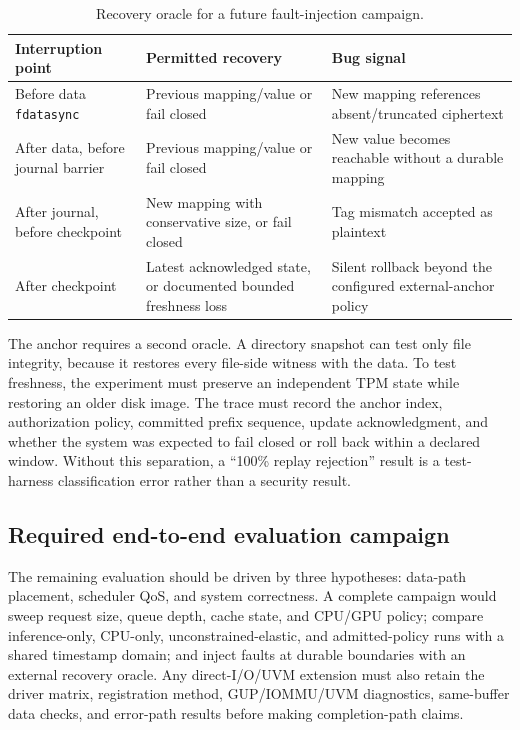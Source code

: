 \begin{table}[t]
\centering
\caption{Recovery oracle for a future fault-injection campaign.}
\scriptsize
\setlength{\tabcolsep}{2pt}
\begin{tabularx}{\columnwidth}{P{0.25\columnwidth}|Y|Y}
\toprule
\textbf{Interruption point} & \textbf{Permitted recovery} & \textbf{Bug signal}\\
\midrule
Before data \texttt{fdatasync} & Previous mapping/value or fail closed & New mapping references absent/truncated ciphertext\\
After data, before journal barrier & Previous mapping/value or fail closed & New value becomes reachable without a durable mapping\\
After journal, before checkpoint & New mapping with conservative size, or fail closed & Tag mismatch accepted as plaintext\\
After checkpoint & Latest acknowledged state, or documented bounded freshness loss & Silent rollback beyond the configured external-anchor policy\\
\bottomrule
\end{tabularx}
\end{table}

The anchor requires a second oracle.  A directory snapshot can test only file
integrity, because it restores every file-side witness with the data.  To test
freshness, the experiment must preserve an independent TPM state while
restoring an older disk image.  The trace must record the anchor index,
authorization policy, committed prefix sequence, update acknowledgment, and
whether the system was expected to fail closed or roll back within a declared
window.  Without this separation, a ``100\% replay rejection'' result is a
test-harness classification error rather than a security result.

\subsection{Required end-to-end evaluation campaign}

The remaining evaluation should be driven by three hypotheses: data-path
placement, scheduler QoS, and system correctness.  A complete campaign would
sweep request size, queue depth, cache state, and CPU/GPU policy; compare
inference-only, CPU-only, unconstrained-elastic, and admitted-policy runs with
a shared timestamp domain; and inject faults at durable boundaries with an
external recovery oracle.  Any direct-I/O/UVM extension must also retain the
driver matrix, registration method, GUP/IOMMU/UVM diagnostics, same-buffer data
checks, and error-path results before making completion-path claims.

